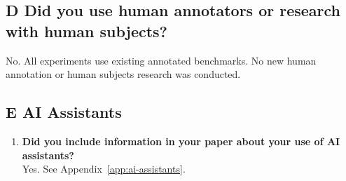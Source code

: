 \subsection*{D\hspace{0.5em} Did you use human annotators or research with human subjects?}

No. All experiments use existing annotated benchmarks. No new human annotation or human subjects research was conducted.

\subsection*{E\hspace{0.5em} AI Assistants}

\begin{enumerate}
\item[E1.] \textbf{Did you include information in your paper about your use of AI assistants?}\\
Yes. See Appendix~\ref{app:ai-assistants}.
\end{enumerate}
